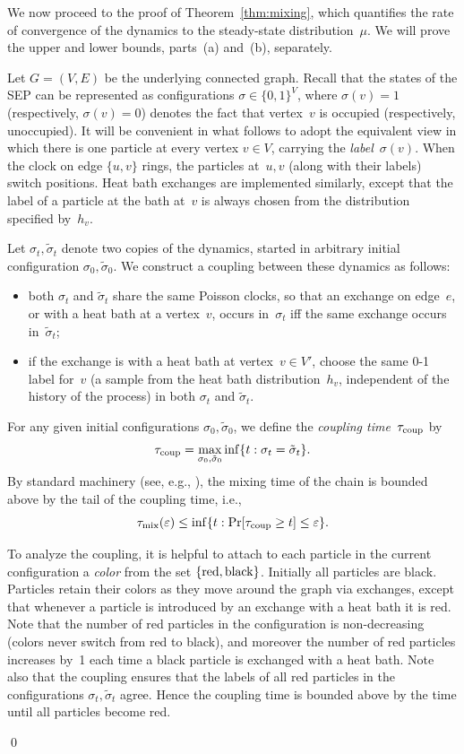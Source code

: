 \documentclass[11pt]{article}
\theoremstyle{plain}
\theoremstyle{definition}
\theoremstyle{remark}
\numberwithin{equation}{section}
\newcommand{\tmix}{\tau_{\rm mix}}
\newcommand{\tcoup}{\tau_{\rm coup}}
\newenvironment{proofof}[1]{{\par\bigskip\noindent \em Proof of #1.}\/}{\hfill\qed\bigskip}
\begin{document}
We now proceed to the proof of Theorem~\ref{thm:mixing}, which quantifies the rate of convergence of the
dynamics to the steady-state distribution~$\mu$.  We will prove the upper and lower bounds, parts~(a) and~(b), separately.
 
\begin{proofof}{Theorem~\ref{thm:mixing}(a)}
Let $G=(V,E)$ be the underlying connected graph.
Recall that the states of the SEP can be represented as configurations $\sigma\in \{0,1\}^V$, where
$\sigma(v)=1$ (respectively, $\sigma(v)=0$) denotes the fact that vertex~$v$ is occupied (respectively,
unoccupied).  It will be convenient in what follows to adopt the equivalent view in which
there is one particle at every vertex $v\in V$, carrying the {\it label}~$\sigma(v)$.  When the clock on edge
$\{u,v\}$ rings, the particles at~$u,v$ (along with their labels) switch positions.  Heat bath exchanges are
implemented similarly, except that the label of a particle at the bath at~$v$ is always chosen from the
distribution specified by~$h_v$.

Let $\sigma_t,\tilde\sigma_t$ denote two copies of the dynamics, started in arbitrary initial configuration $\sigma_0, \tilde\sigma_0$.
We construct a coupling between these dynamics as follows:
\begin{itemize}
\item both $\sigma_t$ and $\tilde\sigma_t$ share the same Poisson clocks, so that an exchange on edge~$e$,
or with a heat bath at a vertex~$v$, occurs in~$\sigma_t$ iff the same exchange occurs in~$\tilde\sigma_t$;
\item if the exchange is with a heat bath at vertex~$v\in V'$, choose the same 0-1 label for~$v$ (a sample
from the heat bath distribution~$h_v$, independent of the history of the process) in both $\sigma_t$ and $\tilde\sigma_t$.
\end{itemize}
For any given initial configurations $\sigma_0,\tilde\sigma_0$, we define the {\it coupling time}~$\tcoup$ by $$
   \tcoup = \max_{\sigma_0,\tilde\sigma_0} \inf\{t: \sigma_t=\tilde\sigma_t\}.  $$
By standard machinery (see, e.g., \cite[Chap.~5]{Peresbook}), the mixing time of the chain is
bounded above by the tail of the coupling time, i.e.,
\begin{equation}\label{eqn:peres}
   \tmix(\varepsilon) \le \inf\{t:\Pr[\tcoup\ge t]\le\varepsilon\}.
\end{equation}

To analyze the coupling, it is helpful to attach to each particle in the current configuration a {\it color\/} 
from the set $\{\rm{red}, \rm{black}\}$.  Initially all particles are black.
Particles retain their colors as they move around the graph via exchanges, except that
whenever a particle is introduced by an exchange with a heat bath it is red. 
Note that the number of red particles in the configuration is non-decreasing (colors never
switch from red to black), and moreover the number of red particles increases by~1 each
time a black particle is exchanged with a heat bath.
Note also that the coupling ensures that the labels of all red
particles in the configurations $\sigma_t,\tilde\sigma_t$ agree.  Hence the coupling time is bounded above by the
time until all particles become red.


\end{proofof}
\end{document}
